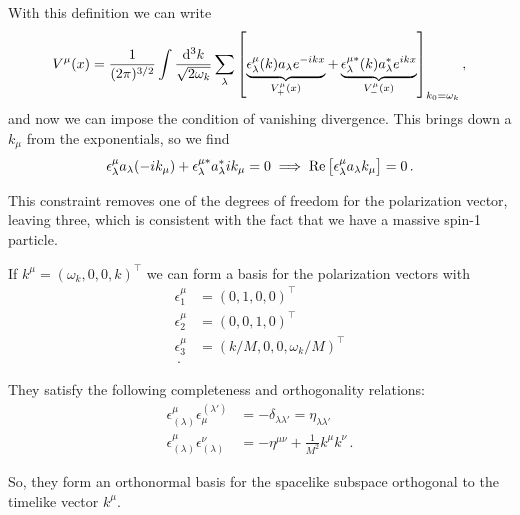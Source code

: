\documentclass[main.tex]{subfiles}
\begin{document}
With this definition we can write 
%
\begin{align}
V^{\mu } (x) = \frac{1}{(2 \pi )^{3/2}}
\int 
\frac{ \dd[3]{k}}{\sqrt{2 \omega_{k}}}
\sum _{\lambda } \qty[
\underbrace{\epsilon^{\mu }_{\lambda }(k) a_\lambda e^{-ikx}}_{V_{+}^{\mu }(x)}
+
\underbrace{\epsilon^{\mu *}_{\lambda } (k) a_\lambda^{*} e^{ikx}}_{V_{-}^{\mu }(x)}
]_{k_0 = \omega_{k}}
\,,
\end{align}
%
and now we can impose the condition of vanishing divergence. This brings down a \(k_{\mu }\) from the exponentials, so we find 
%
\begin{align}
\epsilon^{\mu }_{\lambda } a_{\lambda } (-i k_\mu ) + \epsilon^{\mu *}_{\lambda } a^{*}_{\lambda } i k_\mu = 0 \implies \Re \qty[\epsilon^{\mu }_{\lambda } a_{\lambda } k_\mu ] = 0
\,.
\end{align}


This constraint removes one of the degrees of freedom for the polarization vector, leaving three, which is consistent with the fact that we have a massive spin-1 particle. 

\begin{claim}
If \(k^{\mu } = (\omega_{k}, 0, 0, k)^{\top}\) we can form a basis for the polarization vectors with 
%
\begin{align}
\epsilon^{\mu }_{1} &= (0, 1, 0, 0)^{\top}  \\
\epsilon^{\mu }_{2} &= (0, 0, 1, 0)^{\top}  \\
\epsilon^{\mu }_{3} &= (k/M, 0, 0 , \omega_{k} / M)^{\top}  \\
\,.
\end{align}

They satisfy the following completeness and orthogonality relations: 
%
\begin{align}
\epsilon^{\mu }_{ (\lambda )} \epsilon^{(\lambda' )}_{\mu } &= - \delta_{\lambda \lambda '} = \eta_{\lambda \lambda '} \\
\epsilon^{\mu }_{(\lambda )} \epsilon^{\nu }_{(\lambda )} &= -\eta^{\mu \nu } + \frac{1}{M^2} k^{\mu } k^{\nu }
\,.
\end{align}

So, they form an orthonormal basis for the spacelike subspace orthogonal to the timelike vector \(k^{\mu }\). 
\end{claim}
\end{document}
